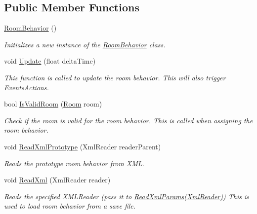 \subsection*{Public Member Functions}
\begin{DoxyCompactItemize}
\item 
\hyperlink{class_project_porcupine_1_1_rooms_1_1_room_behavior_af35b1412339f8b04d90890e65e4eb29b}{Room\+Behavior} ()
\begin{DoxyCompactList}\small\item\em Initializes a new instance of the \hyperlink{class_project_porcupine_1_1_rooms_1_1_room_behavior}{Room\+Behavior} class. \end{DoxyCompactList}\item 
void \hyperlink{class_project_porcupine_1_1_rooms_1_1_room_behavior_a83f1d23b050fb5e8ce2e06a67f7b2fbc}{Update} (float delta\+Time)
\begin{DoxyCompactList}\small\item\em This function is called to update the room behavior. This will also trigger Events\+Actions. \end{DoxyCompactList}\item 
bool \hyperlink{class_project_porcupine_1_1_rooms_1_1_room_behavior_a2d9241fa5a087631437cffe86dbde6e2}{Is\+Valid\+Room} (\hyperlink{class_project_porcupine_1_1_rooms_1_1_room}{Room} room)
\begin{DoxyCompactList}\small\item\em Check if the room is valid for the room behavior. This is called when assigning the room behavior. \end{DoxyCompactList}\item 
void \hyperlink{class_project_porcupine_1_1_rooms_1_1_room_behavior_a7126ff361499e55f3a2badac20549766}{Read\+Xml\+Prototype} (Xml\+Reader reader\+Parent)
\begin{DoxyCompactList}\small\item\em Reads the prototype room behavior from X\+ML. \end{DoxyCompactList}\item 
void \hyperlink{class_project_porcupine_1_1_rooms_1_1_room_behavior_a0374cb2dfc4feb34a3f380bb3528edfd}{Read\+Xml} (Xml\+Reader reader)
\begin{DoxyCompactList}\small\item\em Reads the specified X\+M\+L\+Reader (pass it to \hyperlink{class_project_porcupine_1_1_rooms_1_1_room_behavior_ae48ef51cb4429bf179c1730bdf5857e7}{Read\+Xml\+Params(\+Xml\+Reader)}) This is used to load room behavior from a save file. \end{DoxyCompactList}\item 

\end{DoxyCompactItemize}

